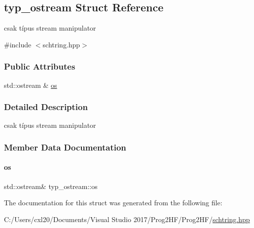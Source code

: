 \subsection{typ\+\_\+ostream Struct Reference}
\label{structtyp__ostream}


csak típus stream manipulator  




{\ttfamily \#include $<$schtring.\+hpp$>$}

\subsubsection*{Public Attributes}
\begin{DoxyCompactItemize}
\item 
std\+::ostream \& \mbox{\hyperlink{structtyp__ostream_abe1bfb5a7bc63e77dbcba6b952e48d7f}{os}}
\end{DoxyCompactItemize}


\subsubsection{Detailed Description}
csak típus stream manipulator 

\subsubsection{Member Data Documentation}
\mbox{\label{structtyp__ostream_abe1bfb5a7bc63e77dbcba6b952e48d7f}} 
\paragraph{\texorpdfstring{os}{os}}
{\footnotesize\ttfamily std\+::ostream\& typ\+\_\+ostream\+::os}



The documentation for this struct was generated from the following file\+:\begin{DoxyCompactItemize}
\item 
C\+:/\+Users/cxl20/\+Documents/\+Visual Studio 2017/\+Prog2\+H\+F/\+Prog2\+H\+F/\mbox{\hyperlink{schtring_8hpp}{schtring.\+hpp}}\end{DoxyCompactItemize}

